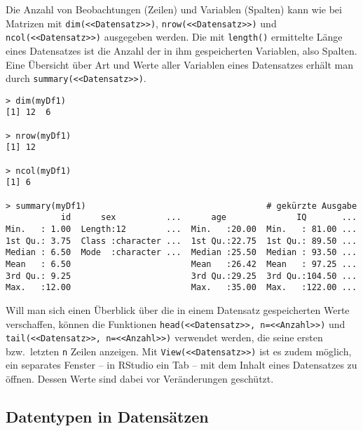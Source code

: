 Die Anzahl von Beobachtungen (Zeilen) und Variablen (Spalten) kann wie bei Matrizen mit \lstinline!dim(<<Datensatz>>)!, \lstinline!nrow(<<Datensatz>>)! und \lstinline!ncol(<<Datensatz>>)! ausgegeben werden. Die mit \lstinline!length()! ermittelte Länge eines Datensatzes ist die Anzahl der in ihm gespeicherten Variablen, also Spalten. Eine Übersicht über Art und Werte aller Variablen eines Datensatzes erhält man durch \lstinline!summary(<<Datensatz>>)!.
\begin{lstlisting}
> dim(myDf1)
[1] 12  6

> nrow(myDf1)
[1] 12

> ncol(myDf1)
[1] 6

> summary(myDf1)                                    # gekürzte Ausgabe
           id      sex          ...      age              IQ       ...
Min.   : 1.00  Length:12        ...  Min.   :20.00  Min.   : 81.00 ...
1st Qu.: 3.75  Class :character ...  1st Qu.:22.75  1st Qu.: 89.50 ...
Median : 6.50  Mode  :character ...  Median :25.50  Median : 93.50 ...
Mean   : 6.50                        Mean   :26.42  Mean   : 97.25 ...
3rd Qu.: 9.25                        3rd Qu.:29.25  3rd Qu.:104.50 ...
Max.   :12.00                        Max.   :35.00  Max.   :122.00 ...
\end{lstlisting}

Will man sich einen Überblick über die in einem Datensatz gespeicherten Werte verschaffen, können die Funktionen \lstinline!head(<<Datensatz>>, n=<<Anzahl>>)! und \lstinline!tail(<<Datensatz>>, n=<<Anzahl>>)! verwendet werden, die seine ersten bzw.\ letzten \lstinline!n! Zeilen anzeigen. Mit \lstinline!View(<<Datensatz>>)! ist es zudem möglich, ein separates Fenster -- in RStudio ein Tab -- mit dem Inhalt eines Datensatzes zu öffnen. Dessen Werte sind dabei vor Veränderungen geschützt.

\subsection{Datentypen in Datensätzen}
\label{sec:dfDataTypes}

